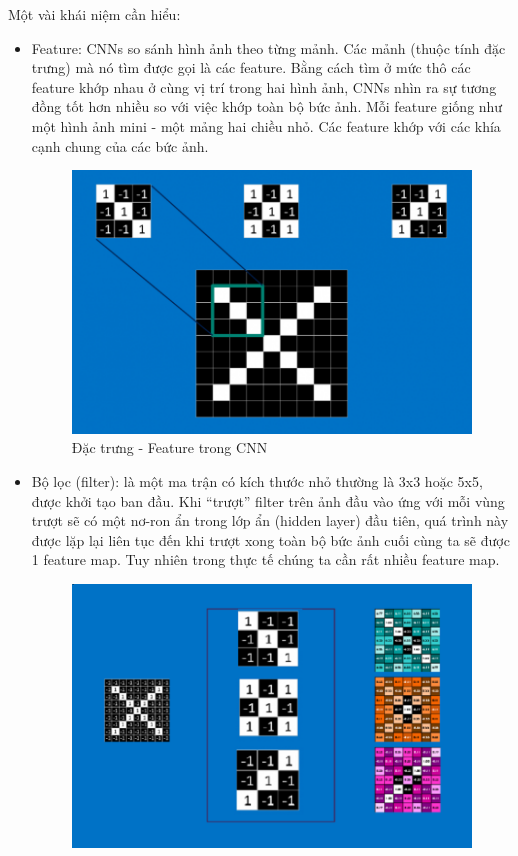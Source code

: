 Một vài khái niệm cần hiểu:
\begin{itemize}
	\item Feature: CNNs so sánh hình ảnh theo từng mảnh. Các mảnh (thuộc tính đặc trưng) mà nó tìm được gọi là các feature. Bằng cách tìm ở mức thô các feature khớp nhau ở cùng vị trí trong hai hình ảnh, CNNs nhìn ra sự tương đồng tốt hơn nhiều so với việc khớp toàn bộ bức ảnh. Mỗi feature giống như một hình ảnh mini - một mảng hai chiều nhỏ. Các feature khớp với các khía cạnh chung của các bức ảnh.
\begin{center}
    \begin{figure}[h!p]
    \begin{center}
     \includegraphics[scale=.5]{img/feature.png}
    \end{center}
    \caption{Đặc trưng - Feature trong CNN \cite{cnn}}
    \label{refhinh1}
    \end{figure}
\end{center}
	\item Bộ lọc (filter): là một ma trận có kích thước nhỏ thường là 3x3 hoặc 5x5, được khởi tạo ban đầu. Khi “trượt” filter trên ảnh đầu vào ứng với mỗi vùng trượt sẽ có một nơ-ron ẩn trong lớp ẩn (hidden layer) đầu tiên, quá trình này được lặp lại liên tục đến khi trượt xong toàn bộ bức ảnh cuối cùng ta sẽ được 1 feature map. Tuy nhiên trong thực tế chúng ta cần rất nhiều feature map.
	\begin{center}
    \begin{figure}[h!]
    \begin{center}
     \includegraphics[scale=0.5]{img/convolution_3.png}

\end{center}
\end{figure}
\end{center}
\end{itemize}
